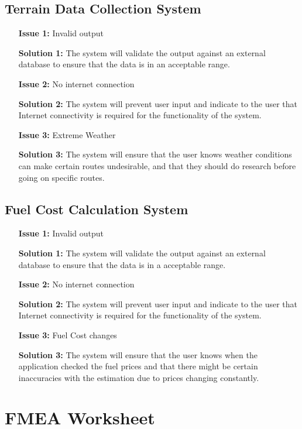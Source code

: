 \documentclass{article}
\begin{document}
\subsection{Terrain Data Collection System}
\begin{itemize}
	\item[\textbf{Issue 1:}] Invalid output
	\item[\textbf{Solution 1:}] The system will validate the output against an external database to ensure that the data is in an acceptable range.
	\item[\textbf{Issue 2:}] No internet connection
	\item[\textbf{Solution 2:}] The system will prevent user input and indicate to the user that Internet connectivity is required for the functionality of the system.
	\item[\textbf{Issue 3:}] Extreme Weather
	\item[\textbf{Solution 3:}] The system will ensure that the user knows weather conditions can make certain routes undesirable, and that they 
	should do research before going on specific routes.
\end{itemize}

\subsection{Fuel Cost Calculation System}
\begin{itemize}
	\item[\textbf{Issue 1:}] Invalid output
	\item[\textbf{Solution 1:}] The system will validate the output against an external database to ensure that the data is in a acceptable range.
	\item[\textbf{Issue 2:}] No internet connection
	\item[\textbf{Solution 2:}] The system will prevent user input and indicate to the user that Internet connectivity is required for the functionality of the system.
	\item[\textbf{Issue 3:}] Fuel Cost changes
	\item[\textbf{Solution 3:}] The system will ensure that the user knows when the application checked the fuel prices and that there might be certain inaccuracies 
	with the estimation due to prices changing constantly.
\end{itemize}

\section{FMEA Worksheet}
\end{document}
